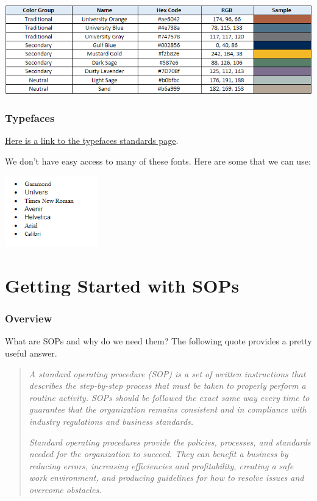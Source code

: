 \documentclass[
  letterpaper,
  DIV=11,
  numbers=noendperiod]{scrreprt}
\begin{document}
\begin{center}
\includegraphics[width=3\textwidth,height=\textheight]{chapters/style_guide/../../graphics/ut_color_standards.png}
\end{center}

\subsection{Typefaces}\label{typefaces}

\href{https://www.uth.edu/brand-standards/visual-identity/type}{Here is
a link to the typefaces standards page}.

We don't have easy access to many of these fonts. Here are some that we
can use:

\begin{center}
\includegraphics[width=0.3\textwidth,height=\textheight]{chapters/style_guide/../../graphics/fonts.png}
\end{center}


\chapter{Getting Started with SOPs}\label{sec-sop_start}

\subsection{Overview}\label{overview}

What are SOPs and why do we need them? The following quote provides a
pretty useful answer.

\begin{quote}
\emph{A standard operating procedure (SOP) is a set of written
instructions that describes the step-by-step process that must be taken
to properly perform a routine activity. SOPs should be followed the
exact same way every time to guarantee that the organization remains
consistent and in compliance with industry regulations and business
standards.}

\emph{Standard operating procedures provide the policies, processes, and
standards needed for the organization to succeed. They can benefit a
business by reducing errors, increasing efficiencies and profitability,
creating a safe work environment, and producing guidelines for how to
resolve issues and overcome obstacles.}
\end{quote}
\end{document}
